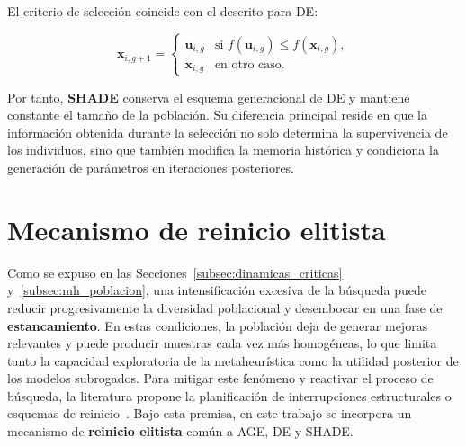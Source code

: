 El criterio de selección coincide con el descrito para DE:

\[
    \mathbf{x}_{i,g+1}
    =
    \begin{cases}
        \mathbf{u}_{i,g}
         & \text{si } f(\mathbf{u}_{i,g})
        \leq f(\mathbf{x}_{i,g}),         \\
        \mathbf{x}_{i,g}
         & \text{en otro caso}.
    \end{cases}
\]

Por tanto, \textbf{SHADE} conserva el esquema generacional de DE y mantiene constante el tamaño de la población. Su diferencia principal reside en que la información obtenida durante la selección no solo determina la supervivencia de los individuos, sino que también modifica la memoria histórica y condiciona la generación de parámetros en iteraciones posteriores.


\section{Mecanismo de reinicio elitista}
\label{sec:mecanismo_reinicio_elitista}






Como se expuso en las Secciones~\ref{subsec:dinamicas_criticas} y~\ref{subsec:mh_poblacion}, una intensificación excesiva de la búsqueda puede reducir progresivamente la diversidad poblacional y desembocar en una fase de \textbf{estancamiento}. En estas condiciones, la población deja de generar mejoras relevantes y puede producir muestras cada vez más homogéneas, lo que limita tanto la capacidad exploratoria de la metaheurística como la utilidad posterior de los modelos subrogados. Para mitigar este fenómeno y reactivar el proceso de búsqueda, la literatura propone la planificación de interrupciones estructurales o esquemas de reinicio~\cite{fukunaga1998restart}. Bajo esta premisa, en este trabajo se incorpora un mecanismo de \textbf{reinicio elitista} común a AGE, DE y SHADE.

